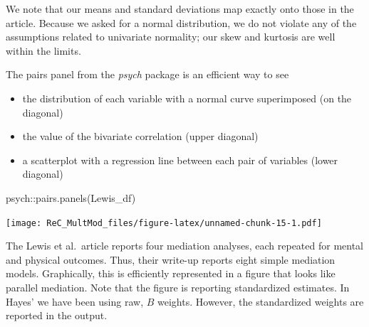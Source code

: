 \documentclass[
  english,
]{book}
\newenvironment{Shaded}{\begin{snugshade}}{\end{snugshade}}
\newcommand{\FunctionTok}[1]{\textcolor[rgb]{0.00,0.00,0.00}{#1}}
\newcommand{\NormalTok}[1]{#1}
\newcommand{\SpecialCharTok}[1]{\textcolor[rgb]{0.00,0.00,0.00}{#1}}
\providecommand{\tightlist}{%
  \setlength{\itemsep}{0pt}\setlength{\parskip}{0pt}}
\begin{document}
We note that our means and standard deviations map exactly onto those in the article. Because we asked for a normal distribution, we do not violate any of the assumptions related to univariate normality; our skew and kurtosis are well within the limits.

The pairs panel from the \emph{psych} package is an efficient way to see

\begin{itemize}
\tightlist
\item
  the distribution of each variable with a normal curve superimposed (on the diagonal)
\item
  the value of the bivariate correlation (upper diagonal)
\item
  a scatterplot with a regression line between each pair of variables (lower diagonal)
\end{itemize}

\begin{Shaded}
\begin{Highlighting}[]
\NormalTok{psych}\SpecialCharTok{::}\FunctionTok{pairs.panels}\NormalTok{(Lewis\_df)}
\end{Highlighting}
\end{Shaded}

\texttt{[image: ReC\_MultMod\_files/figure-latex/unnamed-chunk-15-1.pdf]}

The Lewis et al.~article \citeyearpar{lewis_applying_2017} reports four mediation analyses, each repeated for mental and physical outcomes. Thus, their write-up reports eight simple mediation models. Graphically, this is efficiently represented in a figure that looks like parallel mediation. Note that the figure is reporting standardized estimates. In Hayes' \citeyearpar{hayes_introduction_2018} we have been using raw, \(B\) weights. However, the standardized weights are reported in the output.
\end{document}
